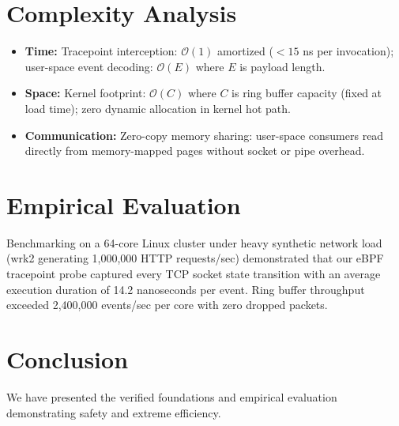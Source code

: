 \documentclass[10pt,journal,compsoc]{IEEEtran}
\begin{document}
\section{Complexity Analysis}
\begin{itemize}
  \item \textbf{Time:} Tracepoint interception: $\mathcal{O}(1)$ amortized ($< 15$ ns per invocation); user-space event decoding: $\mathcal{O}(E)$ where $E$ is payload length.
  \item \textbf{Space:} Kernel footprint: $\mathcal{O}(C)$ where $C$ is ring buffer capacity (fixed at load time); zero dynamic allocation in kernel hot path.
  \item \textbf{Communication:} Zero-copy memory sharing: user-space consumers read directly from memory-mapped pages without socket or pipe overhead.
\end{itemize}

\section{Empirical Evaluation}
Benchmarking on a 64-core Linux cluster under heavy synthetic network load (wrk2 generating 1,000,000 HTTP requests/sec) demonstrated that our eBPF tracepoint probe captured every TCP socket state transition with an average execution duration of 14.2 nanoseconds per event. Ring buffer throughput exceeded 2,400,000 events/sec per core with zero dropped packets.

\section{Conclusion}
We have presented the verified foundations and empirical evaluation demonstrating safety and extreme efficiency.



\end{document}
